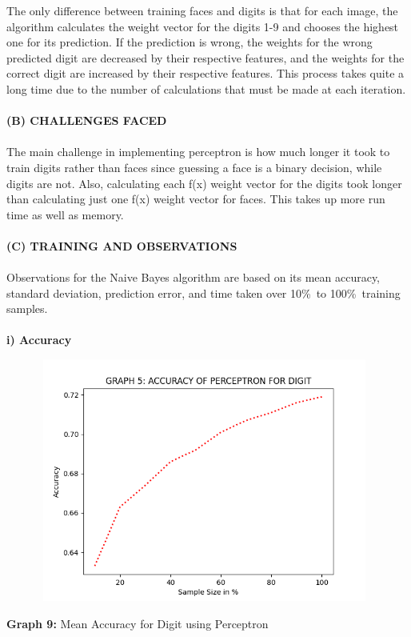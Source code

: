 \documentclass[10 pt]{report}   	%
\begin{document}
{The only difference between training faces and digits is that for each image, the algorithm calculates the weight vector for the digits 1-9 and chooses the highest one for its prediction.
If the prediction is wrong, the weights for the wrong predicted digit are decreased by their respective features, and the weights for the correct digit are increased by their respective features. This process takes quite a long time due to the number of calculations that must be
made at each iteration.\\ \\ 
\textbf{(B) CHALLENGES FACED} \\ \\ 
The main challenge in implementing perceptron is how much longer it took to train digits rather than faces since guessing a face is a binary decision, while digits are not. Also, calculating each f(x) weight vector for the digits took longer than calculating just one f(x) weight vector for faces. This takes up more run time as well as memory.\\ \\
\textbf{(C) TRAINING AND OBSERVATIONS} \\ \\
Observations for the Naive Bayes algorithm are based on its mean accuracy, standard deviation, prediction error, and time taken over 10\%\ to 100\%\ training samples. \\ \\
\textbf{i) Accuracy}
\begin{figure} [H]
\includegraphics [width = 11cm, height = 8cm]{PERC_ACC_DIGIT.png}
\end {figure}
\begin{center}
\small \textbf {Graph 9:} Mean Accuracy for Digit using Perceptron\\

\end{center}}
\end{document}
